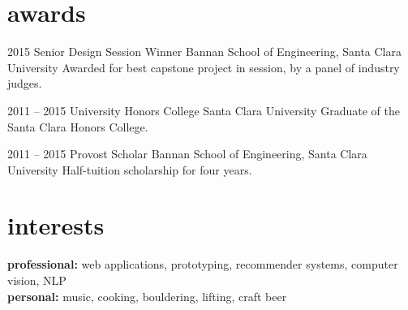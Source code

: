 \documentclass[]{friggeri-cv} %
\begin{document}

\section{awards}

\begin{entrylist}

\entry
{2015}
{Senior Design Session Winner}
{Bannan School of Engineering, Santa Clara University}
{Awarded for best capstone project in session, by a panel of industry judges.}

\entry
{2011 -- 2015}
{University Honors College}
{Santa Clara University}
{Graduate of the Santa Clara Honors College.}

\entry
{2011 -- 2015}
{Provost Scholar}
{Bannan School of Engineering, Santa Clara University}
{Half-tuition scholarship for four years.}


\end{entrylist}


\section{interests}

\textbf{professional:} web applications, prototyping, recommender systems, computer vision, NLP\\
\textbf{personal:} music, cooking, bouldering, lifting, craft beer
\end{document}
